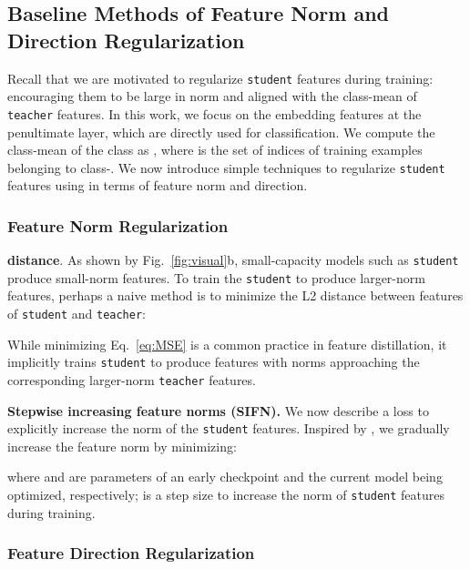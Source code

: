 \documentclass{article}
\begin{document}
\subsection{Baseline Methods of Feature Norm and Direction Regularization}
\label{suboptimal}

Recall that we are motivated to regularize {\tt student} features during training: encouraging them to be large in norm and aligned with the class-mean of {\tt teacher} features. 
In this work, we focus on the embedding features  at the penultimate layer, which are directly used for classification.
We compute the class-mean of the  class as ,
where  is the set of indices of training examples belonging to class-.
We now introduce simple techniques to regularize {\tt student} features using  in terms of feature norm and direction.



\subsubsection{Feature Norm Regularization}\label{sec:FNR}

\textbf{ distance}.
As shown by Fig.~\ref{fig:visual}b, small-capacity models such as  {\tt student} produce small-norm features.
To train the {\tt student} to produce larger-norm features, perhaps a naive method is to minimize the L2 distance between features of {\tt student} and {\tt teacher}:

While minimizing Eq.~\ref{eq:MSE} is a common practice in feature distillation, it implicitly trains {\tt student} to produce features with norms approaching the corresponding larger-norm {\tt teacher} features.







\textbf{Stepwise increasing feature norms (SIFN).}
We now describe a loss to explicitly increase the norm of the {\tt student} features.
Inspired by \cite{xu2019larger}, 
we gradually increase the feature norm by minimizing:

where  and  are parameters of an early checkpoint and the current model being optimized, respectively;
 is a step size to increase the norm of {\tt student} features during training.




\subsubsection{Feature Direction Regularization}\label{sec:FDR}
\end{document}
